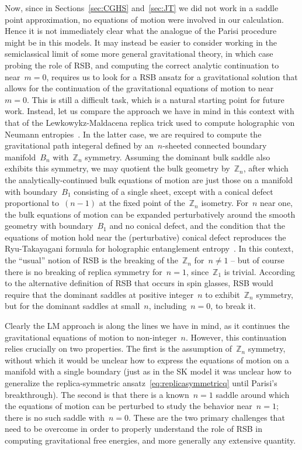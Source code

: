 \documentclass[12pt]{article}
\begin{document}
Now, since in Sections~\ref{sec:CGHS} and~\ref{sec:JT} we did not work in a saddle point approximation, no equations of motion were involved in our calculation.  Hence it is not immediately clear what the analogue of the Parisi procedure might be in this models.  It may instead be easier to consider working in the semiclassical limit of some more general gravitational theory, in which case probing the role of RSB, and computing the correct analytic continuation to near~$m = 0$, requires us to look for a RSB ansatz for a gravitational solution that allows for the continuation of the gravitational equations of motion to near~$m = 0$.  This is still a difficult task, which is a natural starting point for future work.  Instead, let us compare the approach we have in mind in this context with that of the Lewkowykz-Maldacena replica trick used to compute holographic von Neumann entropies~\cite{LewMal13}.  In the latter case, we are required to compute the gravitational path integeral defined by an~$n$-sheeted connected boundary manifold~$B_n$ with~$\mathbb{Z}_n$ symmetry.  Assuming the dominant bulk saddle also exhibits this symmetry, we may quotient the bulk geometry by~$\mathbb{Z}_n$, after which the analytically-continued bulk equations of motion are just those on a manifold with boundary~$B_1$ consisting of a single sheet, except with a conical defect proportional to~$(n-1)$ at the fixed point of the~$\mathbb{Z}_n$ isometry.  For~$n$ near one, the bulk equations of motion can be expanded perturbatively around the smooth geometry with boundary~$B_1$ and no conical defect, and the condition that the equations of motion hold near the (perturbative) conical defect reproduces the Ryu-Takayagani formula for holographic entanglement entropy~\cite{RyuTak06}.  In this context, the ``usual'' notion of RSB is the breaking of the~$\mathbb{Z}_n$ for~$n \neq 1$ -- but of course there is no breaking of replica symmetry for~$n = 1$, since~$\mathbb{Z}_1$ is trivial.  According to the alternative definition of RSB that occurs in spin glasses, RSB would require that the dominant saddles at positive integer~$n$ to exhibit~$\mathbb{Z}_n$ symmetry, but for the dominant saddles at small~$n$, including~$n = 0$, to break it.

Clearly the LM approach is along the lines we have in mind, as it continues the gravitational equations of motion to non-integer~$n$.  However, this continuation relies crucially on two properties.  The first is the assumption of~$\mathbb{Z}_n$ symmetry, without which it would be unclear how to express the equations of motion on a manifold with a single boundary (just as in the SK model it was unclear how to generalize the replica-symmetric ansatz~\eqref{eq:replicasymmetricq} until Parisi's breakthrough).  The second is that there is a known~$n = 1$ saddle around which the equations of motion can be perturbed to study the behavior near~$n = 1$; there is no such saddle with~$n = 0$.  These are the two primary challenges that need to be overcome in order to properly understand the role of RSB in computing gravitational free energies, and more generally any extensive quantity. 
\end{document}
